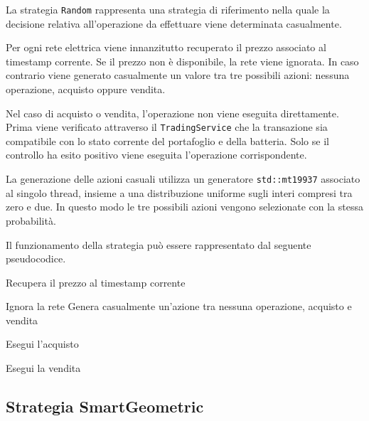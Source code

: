\documentclass[a4paper,oneside,italian]{sapthesis}
\begin{document}
La strategia \texttt{Random} rappresenta una strategia di riferimento nella
quale la decisione relativa all'operazione da effettuare viene determinata
casualmente.

Per ogni rete elettrica viene innanzitutto recuperato il prezzo associato
al timestamp corrente. Se il prezzo non è disponibile, la rete viene
ignorata. In caso contrario viene generato casualmente un valore tra tre
possibili azioni: nessuna operazione, acquisto oppure vendita.

Nel caso di acquisto o vendita, l'operazione non viene eseguita
direttamente. Prima viene verificato attraverso il \texttt{TradingService}
che la transazione sia compatibile con lo stato corrente del portafoglio e
della batteria. Solo se il controllo ha esito positivo viene eseguita
l'operazione corrispondente.

La generazione delle azioni casuali utilizza un generatore
\texttt{std::mt19937} associato al singolo thread, insieme a una
distribuzione uniforme sugli interi compresi tra zero e due. In questo modo
le tre possibili azioni vengono selezionate con la stessa probabilità.

Il funzionamento della strategia può essere rappresentato dal seguente
pseudocodice.

\begin{algorithm}[H]
\caption{Strategia Random}
\label{alg:random-strategy}
\begin{algorithmic}[1]

    \State Recupera il prezzo al timestamp corrente

        \State Ignora la rete
    \Else
        \State Genera casualmente un'azione tra nessuna operazione,
        acquisto e vendita

                \State Esegui l'acquisto
            \EndIf

                \State Esegui la vendita
            \EndIf
        \EndIf
    \EndIf
\EndFor

\end{algorithmic}
\end{algorithm}

\subsection{Strategia SmartGeometric}
\end{document}
